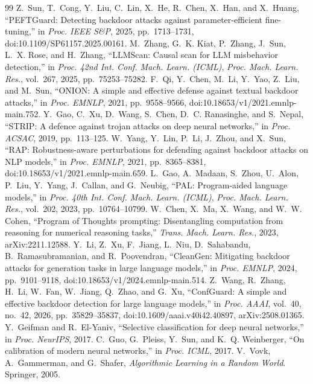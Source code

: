 \documentclass[journal]{IEEEtran}
\begin{document}
\begin{thebibliography}{99}
 Z.~Sun, T.~Cong, Y.~Liu, C.~Lin, X.~He, R.~Chen, X.~Han, and X.~Huang, ``PEFTGuard: Detecting backdoor attacks against parameter-efficient fine-tuning,'' in \emph{Proc. IEEE S\&P}, 2025, pp.~1713--1731, doi:10.1109/SP61157.2025.00161.
 M.~Zhang, G.~K. Kiat, P.~Zhang, J.~Sun, L.~X. Rose, and H.~Zhang, ``LLMScan: Causal scan for LLM misbehavior detection,'' in \emph{Proc. 42nd Int. Conf. Mach. Learn. (ICML)}, \emph{Proc. Mach. Learn. Res.}, vol.~267, 2025, pp.~75253--75282.
 F.~Qi, Y.~Chen, M.~Li, Y.~Yao, Z.~Liu, and M.~Sun, ``ONION: A simple and effective defense against textual backdoor attacks,'' in \emph{Proc. EMNLP}, 2021, pp.~9558--9566, doi:10.18653/v1/2021.emnlp-main.752.
 Y.~Gao, C.~Xu, D.~Wang, S.~Chen, D.~C. Ranasinghe, and S.~Nepal, ``STRIP: A defence against trojan attacks on deep neural networks,'' in \emph{Proc. ACSAC}, 2019, pp.~113--125.
 W.~Yang, Y.~Lin, P.~Li, J.~Zhou, and X.~Sun, ``RAP: Robustness-aware perturbations for defending against backdoor attacks on NLP models,'' in \emph{Proc. EMNLP}, 2021, pp.~8365--8381, doi:10.18653/v1/2021.emnlp-main.659.
 L.~Gao, A.~Madaan, S.~Zhou, U.~Alon, P.~Liu, Y.~Yang, J.~Callan, and G.~Neubig, ``PAL: Program-aided language models,'' in \emph{Proc. 40th Int. Conf. Mach. Learn. (ICML)}, \emph{Proc. Mach. Learn. Res.}, vol.~202, 2023, pp.~10764--10799.
 W.~Chen, X.~Ma, X.~Wang, and W.~W. Cohen, ``Program of Thoughts prompting: Disentangling computation from reasoning for numerical reasoning tasks,'' \emph{Trans. Mach. Learn. Res.}, 2023, arXiv:2211.12588.
 Y.~Li, Z.~Xu, F.~Jiang, L.~Niu, D.~Sahabandu, B.~Ramasubramanian, and R.~Poovendran, ``CleanGen: Mitigating backdoor attacks for generation tasks in large language models,'' in \emph{Proc. EMNLP}, 2024, pp.~9101--9118, doi:10.18653/v1/2024.emnlp-main.514.
 Z.~Wang, R.~Zhang, H.~Li, W.~Fan, W.~Jiang, Q.~Zhao, and G.~Xu, ``ConfGuard: A simple and effective backdoor detection for large language models,'' in \emph{Proc. AAAI}, vol.~40, no.~42, 2026, pp.~35829--35837, doi:10.1609/aaai.v40i42.40897, arXiv:2508.01365.
 Y.~Geifman and R.~El-Yaniv, ``Selective classification for deep neural networks,'' in \emph{Proc. NeurIPS}, 2017.
 C.~Guo, G.~Pleiss, Y.~Sun, and K.~Q. Weinberger, ``On calibration of modern neural networks,'' in \emph{Proc. ICML}, 2017.
 V.~Vovk, A.~Gammerman, and G.~Shafer, \emph{Algorithmic Learning in a Random World}. Springer, 2005.

\end{thebibliography}
\end{document}
